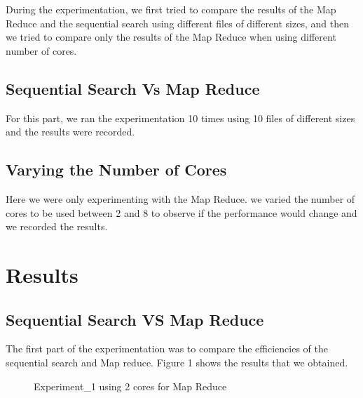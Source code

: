 \documentclass[12pt]{article}
\begin{document}
		During the experimentation, we first tried to compare the results of the Map Reduce and the sequential search using different files of different sizes, and then we tried to compare only the results of the Map Reduce when using different number of cores.
		

		\subsection{Sequential Search Vs Map Reduce}
			For this part, we ran the experimentation 10 times using 10 files of different sizes and the results were recorded.
		\subsection{Varying the Number of Cores}
			Here we were only experimenting with the Map Reduce. we varied the number of cores to be used between 2 and 8 to observe if the performance would change and we recorded the results.
		
	\section{Results}
		\subsection{Sequential Search VS Map Reduce}
		The first part of the experimentation was to compare the efficiencies of the sequential search and Map reduce. Figure 1 shows the results that we obtained.
		\begin{figure}[H]
			\hfill
			\hfill
			\hfill
			\caption{Experiment\_1 using 2 cores for Map Reduce}
		\end{figure}
 		
\end{document}
